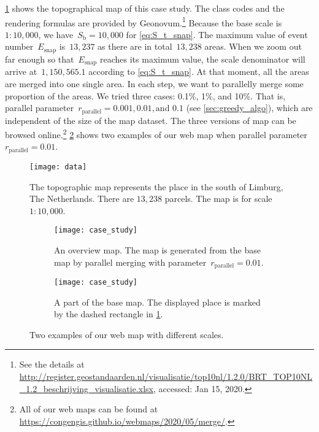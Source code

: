 \documentclass[]{interact}
\begin{document}
%
\figs\ref{fig:data} shows the topographical map of this case study.
The class codes and the rendering formulas are provided by Geonovum.\footnote{%
See the details at
\url{http://register.geostandaarden.nl/visualisatie/top10nl/1.2.0/BRT_TOP10NL_1.2_beschrijving_visualisatie.xlsx},
accessed: Jan 15, 2020.}
%
Because the base scale is $1:10{,}000$, 
we have~$S_\mathrm{b} = 10{,}000$ for \eq\ref{eq:S_t_snap}.
The maximum value of event number~$E_\mathrm{snap}$ is~$13{,}237$
as there are in total~$13{,}238$ areas.
When we zoom out far enough 
so that~$E_\mathrm{snap}$ reaches its maximum value,
the scale denominator will arrive at~$1{,}150{,}565.1$
according to \eq\ref{eq:S_t_snap}.
At that moment, all the areas are merged into one single area.
In each step, we want to parallelly merge some proportion of the areas.
We tried three cases: 0.1\%, 1\%, and 10\%.
That is, parallel parameter~$r_\mathrm{parallel}=0.001, 0.01, \text{and~} 0.1$ 
(see \sect\ref{sec:greedy_algo}), 
which are independent of the size of the map dataset.
The three versions of map can be browsed online.\footnote{%
All of our web maps can be found at
\url{https://congengis.github.io/webmaps/2020/05/merge/}.}
\fig\ref{fig:web_map} shows two examples of our web map when 
parallel parameter~$r_\mathrm{parallel}=0.01$.


\begin{figure}[tb]
\centering
\texttt{[image: data]}
\caption{
    The topographic map represents the place 
    in the south of Limburg, The Netherlands.
    There are $13{,}238$ parcels.
    The map is for scale $1:10{,}000$.}
\label{fig:data}
\end{figure}


\begin{figure}[tb]
\centering
\begin{subfigure}[t]{\textwidth}
\centering
\texttt{[image: case\_study]}
\caption{An overview map. The map is generated from the base map 
    by parallel merging with parameter~$r_\mathrm{parallel}= 0.01$.}
\end{subfigure}
\newline
\vspace{0.5cm}
%
\begin{subfigure}[t]{\textwidth}
\centering
\texttt{[image: case\_study]}
\caption{A part of the base map. The displayed place is marked 
    by the dashed rectangle in \fig\ref{fig:data}.}
\end{subfigure}
\caption{Two examples of our web map with different scales.
    }
\label{fig:web_map}
\end{figure}
\end{document}
